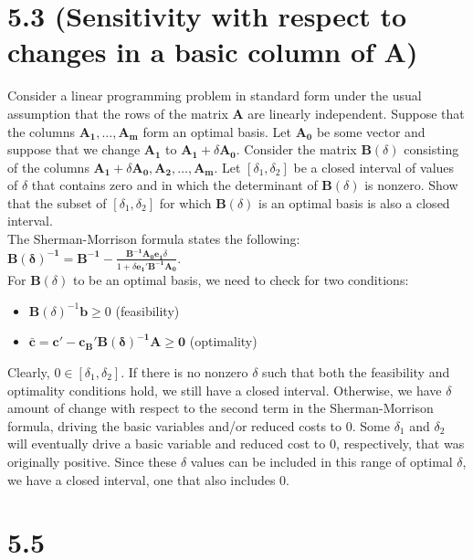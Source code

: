 \documentclass{article}
\begin{document}
\section*{5.3 (Sensitivity with respect to changes in a basic column of A)}
Consider a linear programming problem in standard form under the usual assumption that the rows of the matrix $\mathbf{A}$ are linearly independent.  Suppose that the columns $\mathbf{A_1, \ldots, A_m}$ form an optimal basis.  Let $\mathbf{A_0}$ be some vector and suppose that we change $\mathbf{A_1}$ to $\mathbf{A_1} + \delta \mathbf{A_0}$.  Consider the matrix $\mathbf{B}(\delta)$ consisting of the columns $\mathbf{A_1} + \delta \mathbf{A_0, A_2, \ldots, A_m}$.  Let $[\delta_1, \delta_2]$ be a closed interval of values of $\delta$ that contains zero and in which the determinant of $\mathbf{B}(\delta)$ is nonzero.  Show that the subset of $[\delta_1, \delta_2]$ for which $\mathbf{B}(\delta)$ is an optimal basis is also a closed interval.  \\


\noindent
The Sherman-Morrison formula states the following:  $\mathbf{B(\delta)^{-1} = B^{-1} - } \frac{ \mathbf{B^{-1} A_0 e_1} \delta }{1 + \delta \mathbf{e_1' B^{-1} A_0}} $. \\
For $\mathbf{B}(\delta)$ to be an optimal basis, we need to check for two conditions:
\begin{itemize}
	\item $\mathbf{B}(\delta)^{-1} \mathbf{b} \geq 0$ (feasibility) 
	\item $\mathbf{ \bar{c} = c' - c_B' B(\delta)^{-1}A \geq 0 }$ (optimality)
\end{itemize}

\noindent
Clearly, $0 \in [\delta_1, \delta_2].$  If there is no nonzero $\delta$ such that both the feasibility and optimality conditions hold, we still have a closed interval.  Otherwise, we have $\delta$ amount of change with respect to the second term in the Sherman-Morrison formula, driving the basic variables and/or reduced costs to 0.  Some $\delta_1$ and $\delta_2$ will eventually drive a basic variable and reduced cost to 0, respectively, that was originally positive.  Since these $\delta$ values can be included in this range of optimal $\delta$, we have a closed interval, one that also includes 0. \\



\section*{5.5}
\end{document}
